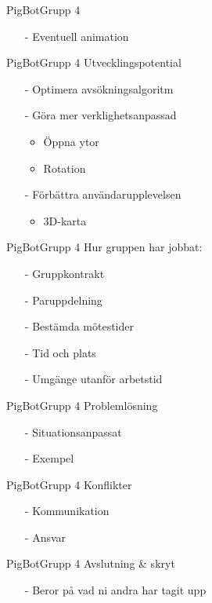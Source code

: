\begin{frame}[fragile]{PigBot}{Grupp 4}
  \begin{itemize}
    \item[-] Eventuell animation 
  \end{itemize}
\end{frame}

\begin{frame}[fragile]{PigBot}{Grupp 4}
Utvecklingspotential 
  \begin{itemize}
 \pause
    \item[-] Optimera avsökningsalgoritm
 \pause
    \item[-] Göra mer verklighetsanpassad
	\begin{itemize}
	  \item Öppna ytor
	  \item Rotation
	\end{itemize}	
  \pause
    \item[-] Förbättra användarupplevelsen
     	\begin{itemize}
	  \item 3D-karta
	\end{itemize}
   \end{itemize}
\end{frame}


\begin{frame}[fragile]{PigBot}{Grupp 4}
Hur gruppen har jobbat:
  \begin{itemize}
 \pause
    \item[-] Gruppkontrakt 
\pause
    \item[-] Paruppdelning
\pause
    \item[-] Bestämda mötestider
\pause
    \item[-] Tid och plats
\pause
    \item[-] Umgänge utanför arbetstid
  \end{itemize}
\end{frame}

\begin{frame}[fragile]{PigBot}{Grupp 4}
Problemlösning
  \begin{itemize}
 \pause
    \item[-] Situationsanpassat
\pause
    \item[-] Exempel
  \end{itemize}
\end{frame}

\begin{frame}[fragile]{PigBot}{Grupp 4}
Konflikter
  \begin{itemize}
 \pause
    \item[-] Kommunikation
\pause
    \item[-] Ansvar
  \end{itemize}
\end{frame}

\begin{frame}[fragile]{PigBot}{Grupp 4}
Avslutning \& skryt
  \begin{itemize}
 \pause
    \item[-] Beror på vad ni andra har tagit upp
  \end{itemize}
\end{frame}

